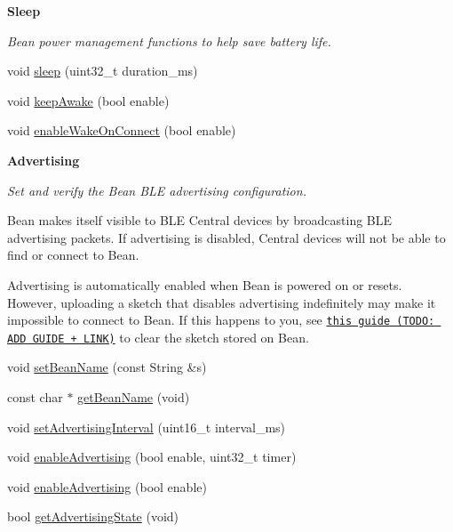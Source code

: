 \begin{Indent}{\bf Sleep}\par
{\em Bean power management functions to help save battery life. }\begin{DoxyCompactItemize}
\item 
void \hyperlink{class_bean_class_a15d6716d0bdc66a0345acc29d0c14a14}{sleep} (uint32\+\_\+t duration\+\_\+ms)
\item 
void \hyperlink{class_bean_class_abbd5ae43b98270dfc94b98b2ecd66281}{keep\+Awake} (bool enable)
\item 
void \hyperlink{class_bean_class_a639e425394c820a99025d136dddd3369}{enable\+Wake\+On\+Connect} (bool enable)
\end{DoxyCompactItemize}
\end{Indent}
\begin{Indent}{\bf Advertising}\par
{\em Set and verify the Bean B\+L\+E advertising configuration.

Bean makes itself visible to B\+L\+E Central devices by broadcasting B\+L\+E advertising packets. If advertising is disabled, Central devices will not be able to find or connect to Bean.

Advertising is automatically enabled when Bean is powered on or resets. However, uploading a sketch that disables advertising indefinitely may make it impossible to connect to Bean. If this happens to you, see \href{#}{\tt this guide (T\+O\+D\+O\+: A\+D\+D G\+U\+I\+D\+E + L\+I\+N\+K)} to clear the sketch stored on Bean. }\begin{DoxyCompactItemize}
\item 
void \hyperlink{class_bean_class_a32c0dc702c367caf274b72ba4a4cb8a2}{set\+Bean\+Name} (const String \&s)
\item 
const char $\ast$ \hyperlink{class_bean_class_a5b50d48ce0b6ccb3f267d1d7ba660dd3}{get\+Bean\+Name} (void)
\item 
void \hyperlink{class_bean_class_a41412684c0f01f06f260fb1e724475d9}{set\+Advertising\+Interval} (uint16\+\_\+t interval\+\_\+ms)
\item 
void \hyperlink{class_bean_class_a9bff2d903c4a543ba48f0ac1b392c7cc}{enable\+Advertising} (bool enable, uint32\+\_\+t timer)
\item 
void \hyperlink{class_bean_class_ade5d4c6a061eeb6d7897ef4c3b2c26d3}{enable\+Advertising} (bool enable)
\item 
bool \hyperlink{class_bean_class_a099bbffcf98e71f533f8277ec5274785}{get\+Advertising\+State} (void)
\end{DoxyCompactItemize}
\end{Indent}
